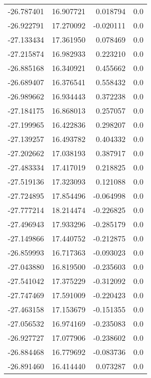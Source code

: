 \begin{tabular}{rrrr}
      -26.787401 &        16.907721 &    0.018794 &   0.0 \\
      -26.922791 &        17.270092 &   -0.020111 &   0.0 \\
      -27.133434 &        17.361950 &    0.078469 &   0.0 \\
      -27.215874 &        16.982933 &    0.223210 &   0.0 \\
      -26.885168 &        16.340921 &    0.455662 &   0.0 \\
      -26.689407 &        16.376541 &    0.558432 &   0.0 \\
      -26.989662 &        16.934443 &    0.372238 &   0.0 \\
      -27.184175 &        16.868013 &    0.257057 &   0.0 \\
      -27.199965 &        16.422836 &    0.298207 &   0.0 \\
      -27.139257 &        16.493782 &    0.404332 &   0.0 \\
      -27.202662 &        17.038193 &    0.387917 &   0.0 \\
      -27.483334 &        17.417019 &    0.218825 &   0.0 \\
      -27.519136 &        17.323093 &    0.121088 &   0.0 \\
      -27.724895 &        17.854496 &   -0.064998 &   0.0 \\
      -27.777214 &        18.214474 &   -0.226825 &   0.0 \\
      -27.496943 &        17.933296 &   -0.285179 &   0.0 \\
      -27.149866 &        17.440752 &   -0.212875 &   0.0 \\
      -26.859993 &        16.717363 &   -0.093023 &   0.0 \\
      -27.043880 &        16.819500 &   -0.235603 &   0.0 \\
      -27.541042 &        17.375229 &   -0.312092 &   0.0 \\
      -27.747469 &        17.591009 &   -0.220423 &   0.0 \\
      -27.463158 &        17.153679 &   -0.151355 &   0.0 \\
      -27.056532 &        16.974169 &   -0.235083 &   0.0 \\
      -26.927727 &        17.077906 &   -0.238602 &   0.0 \\
      -26.884468 &        16.779692 &   -0.083736 &   0.0 \\
      -26.891460 &        16.414440 &    0.073287 &   0.0 \\

\end{tabular}
